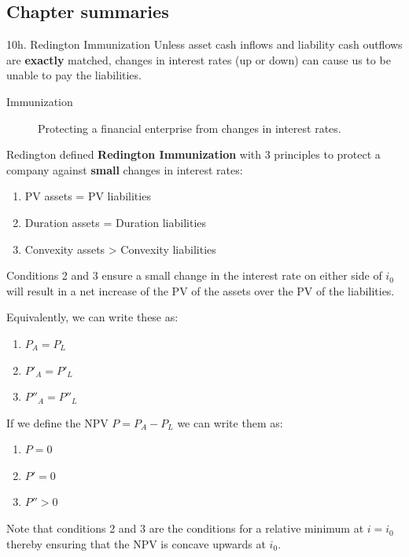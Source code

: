 \subsection{Chapter summaries}

\begin{CHPT_SUMM_AUTO}[label = {L.-10h}]{10h. Redington Immunization}
Unless asset cash inflows and liability cash outflows are \textbf{exactly} matched, changes in interest rates (up or down) can cause us to be unable to pay the liabilities.
\begin{description}
	\item[Immunization]	Protecting a financial enterprise from changes in interest rates.
\end{description}


Redington defined \textbf{Redington Immunization} with 3 principles to protect a company against \textbf{small} changes in interest rates:
\begin{enumerate}
	\item	PV assets = PV liabilities
	\item	Duration assets = Duration liabilities
	\item	Convexity assets > Convexity liabilities
\end{enumerate}

Conditions 2 and 3 ensure a small change in the interest rate on either side of $i_{0}$ will result in a net increase of the PV of the assets over the PV of the liabilities.

Equivalently, we can write these as:
\begin{enumerate}
	\item	$P_{A} = P_{L}$
	\item	$P'_{A} = P'_{L}$
	\item	$P''_{A} = P''_{L}$
\end{enumerate}

If we define the NPV $P = P_{A} - P_{L}$ we can write them as:
\begin{enumerate}
	\item	$P = 0$
	\item	$P' = 0$
	\item	$P'' > 0$
\end{enumerate}

Note that conditions 2 and 3 are the conditions for a relative minimum at $i = i_{0}$ thereby ensuring that the NPV is concave upwards at $i_{0}$.
\end{CHPT_SUMM_AUTO}

